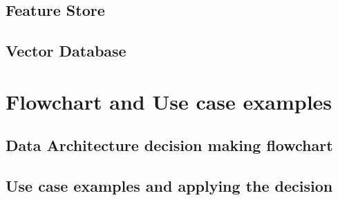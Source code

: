 \documentclass[11pt]{article}
\begin{document}
    \subsection{Feature Store}

    \subsection{Vector Database}

    \section{Flowchart and Use case examples}

    \subsection{Data Architecture decision making flowchart}

    \subsection{Use case examples and applying the decision}
\end{document}
